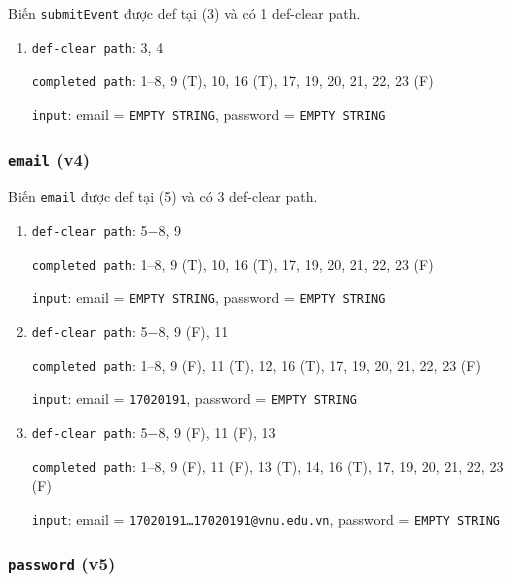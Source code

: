 \documentclass{article}
\begin{document}
\par Biến \texttt{submitEvent} được def tại (3) và có 1 def-clear path.

\begin{enumerate}
    \item \texttt{def-clear path}: 3, 4
          \par \texttt{completed path}: 1--8, 9 (T), 10, 16 (T), 17, 19, 20, 21, 22, 23 (F)
          \par \texttt{input}: email = \texttt{EMPTY STRING}, password = \texttt{EMPTY STRING}
\end{enumerate}

\subsubsection*{\texttt{email} (v4)}

\par Biến \texttt{email} được def tại (5) và có 3 def-clear path.

\begin{enumerate}
    \item \texttt{def-clear path}: 5$-$8, 9
          \par \texttt{completed path}: 1--8, 9 (T), 10, 16 (T), 17, 19, 20, 21, 22, 23 (F)
          \par \texttt{input}: email = \texttt{EMPTY STRING}, password = \texttt{EMPTY STRING}

    \item \texttt{def-clear path}: 5$-$8, 9 (F), 11
          \par \texttt{completed path}: 1--8, 9 (F), 11 (T), 12, 16 (T), 17, 19, 20, 21, 22, 23 (F)
          \par \texttt{input}: email = \texttt{17020191}, password = \texttt{EMPTY STRING}

    \item \texttt{def-clear path}: 5$-$8, 9 (F), 11 (F), 13
          \par \texttt{completed path}: 1--8, 9 (F), 11 (F), 13 (T), 14, 16 (T), 17, 19, 20, 21, 22, 23 (F)
          \par \texttt{input}: email = \texttt{17020191\ldots17020191@vnu.edu.vn}, password = \texttt{EMPTY STRING}
\end{enumerate}

\subsubsection*{\texttt{password} (v5)}
\end{document}
